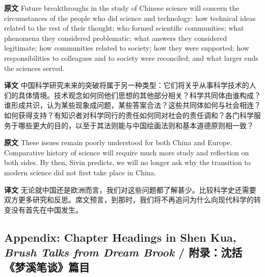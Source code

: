 \documentclass[UTF8,zihao=-4]{ctexart}
\newcommand{\BodyFont}{\fontsize{10.5pt}{15.5pt}\selectfont}
\newcommand{\origlabel}{\textbf{原文}\quad}
\newcommand{\translabel}{\textbf{译文}\quad}
\newenvironment{enblock}{\par\noindent\begingroup\BodyFont\origlabel}{\par\endgroup}
\newenvironment{zhblock}{\par\noindent\begingroup\BodyFont\translabel}{\par\endgroup\vspace{0.35em}}
\begin{document}
\begin{enblock}
Future breakthroughs in the study of Chinese science will concern the circumstances of the people who did science and technology: how technical ideas related to the rest of their thought; who formed scientific communities; what phenomena they considered problematic; what answers they considered legitimate; how communities related to society; how they were supported; how responsibilities to colleagues and to society were reconciled; and what larger ends the sciences served.
\end{enblock}
\begin{zhblock}
中国科学研究未来的突破将属于另一种类型：它们将关乎从事科学技术的人们的具体情境。技术观念如何同他们思想的其他部分相关？科学共同体由谁构成？谁形成共识，认为某些现象成问题，某些答案合法？这些共同体如何与社会相连？如何获得支持？有知识者对科学同行的责任如何同对社会的责任调和？各门科学服务于哪些更大的目的，以至于其法则能与中国绘画法则和基本道德原则相一致？
\end{zhblock}

\begin{enblock}
These issues remain poorly understood for both China and Europe. Comparative history of science will require much more study and reflection on both sides. By then, Sivin predicts, we will no longer ask why the transition to modern science did not first take place in China.
\end{enblock}
\begin{zhblock}
无论就中国还是欧洲而言，我们对这些问题都了解甚少。比较科学史还需要双方更多研究和反思。席文预言，到那时，我们将不再追问为什么向现代科学的转变没有首先在中国发生。
\end{zhblock}

\subsection*{Appendix: Chapter Headings in Shen Kua, \emph{Brush Talks from Dream Brook} / 附录：沈括《梦溪笔谈》篇目}
\end{document}
